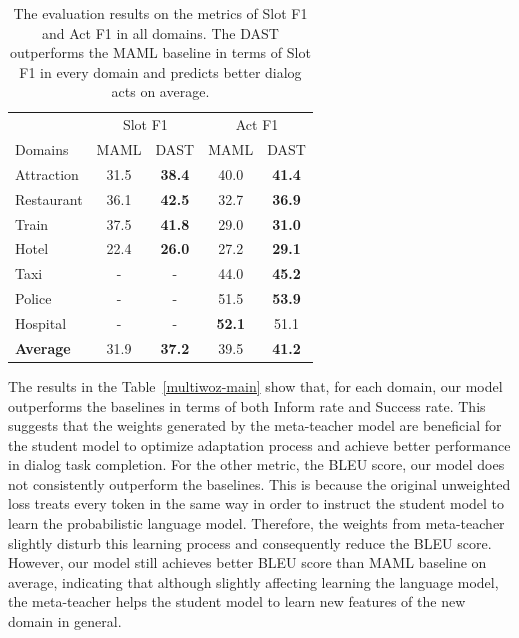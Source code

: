 \documentclass[letterpaper]{article}
\begin{document}
\begin{table}[ht!]
\centering
\setlength{\extrarowheight}{0.06cm}
\small
\begin{tabular}[width=\columnwidth]{l|cccc}
\toprule
\hline
& \multicolumn{2}{c}{Slot F1} & \multicolumn{2}{c}{Act F1}\\
\cmidrule(lr){2-3} \cmidrule(lr){4-5}
Domains  &MAML& DAST &MAML& DAST  \\
\hline
Attraction & 31.5                 & \textbf{38.4}                 & 40.0                 & \textbf{41.4}  \\
\hline
Restaurant & 36.1                 & \textbf{42.5 }                & 32.7                 & \textbf{36.9}  \\
\hline
Train     & 37.5                 & \textbf{41.8}                 & 29.0                 & \textbf{31.0}\\
\hline
Hotel& 22.4                 & \textbf{26.0}                 & 27.2                 & \textbf{29.1} \\
\hline
Taxi & -                & -               & 44.0                 & \textbf{45.2}                  \\
\hline
Police & -                 &-                & 51.5                 & \textbf{53.9 }                 \\
\hline
Hospital&-         & -      & \textbf{52.1}   & 51.1  \\
\hline
\textbf{Average}  & 31.9    & \textbf{37.2}  & 39.5   & \textbf{41.2}\\
\hline
\bottomrule
\end{tabular}
\caption{The evaluation results on the metrics of Slot F1 and Act F1 in all domains. The DAST outperforms the MAML baseline in terms of Slot F1 in every domain and predicts better dialog acts on average. }
\label{multiwoz_slot}
\end{table}


The results in the Table~\ref{multiwoz-main} show that, for each domain, our model outperforms the baselines in terms of both Inform rate and Success rate. This suggests that the weights generated by the meta-teacher model are beneficial for the student model to optimize adaptation process and achieve better performance in dialog task completion.
For the other metric, the BLEU score, our model does not consistently outperform the baselines. This is because the original unweighted loss treats every token in the same way in order to instruct the student model to learn the probabilistic language model. Therefore, the weights from meta-teacher slightly disturb this learning process and consequently reduce the BLEU score. However, our model still achieves better BLEU score than MAML baseline on average, indicating that although slightly affecting learning the language model, the meta-teacher helps the student model to learn new features of the new domain in general.
\end{document}
